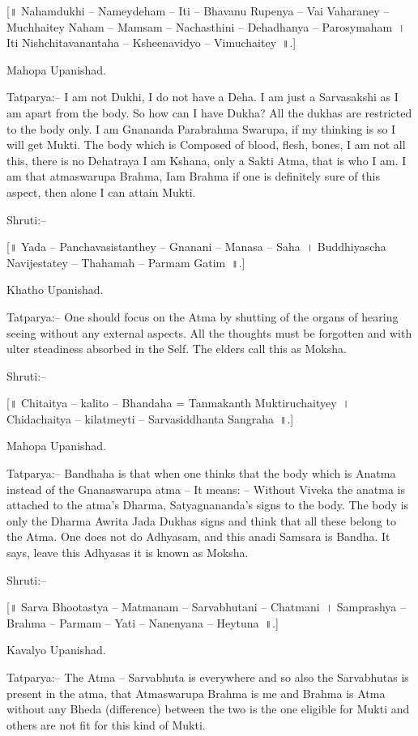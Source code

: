 [॥ Nahamdukhi – Nameydeham – Iti – Bhavanu Rupenya – Vai Vaharaney – Muchhaitey Naham – Mamsam – Nachasthini – Dehadhanya – Parosymaham~। Iti Nishchitavanantaha – Ksheenavidyo – Vimuchaitey~॥.]

Mahopa Upanishad.

Tatparya:– I am not Dukhi, I do not have a Deha. I am just a Sarvasakshi as I am apart from the body. So how can I have Dukha? All the dukhas are restricted to the body only. I am Gnananda Parabrahma Swarupa, if my thinking is so I will get Mukti. The body which is Composed of blood, flesh, bones, I am not all this, there is no Dehatraya I am Kshana, only a Sakti Atma, that is who I am. I am that atmaswarupa Brahma, Iam Brahma if one is definitely sure of this aspect, then alone I can attain Mukti.

Shruti:–

[॥ Yada – Panchavasistanthey – Gnanani – Manasa – Saha~। Buddhiyascha Navijestatey – Thahamah – Parmam Gatim~॥.]

Khatho Upanishad.

Tatparya:– One should focus on the Atma by shutting of the organs of hearing seeing without any external aspects. All the thoughts must be forgotten and with ulter steadiness absorbed in the Self. The elders call this as Moksha.

Shruti:–

[॥ Chitaitya – kalito – Bhandaha = Tanmakanth Muktiruchaityey~। Chidachaitya – kilatmeyti – Sarvasiddhanta Sangraha~॥.]

Mahopa Upanishad.

Tatparya:– Bandhaha is that when one thinks that the body which is Anatma instead of the Gnanaswarupa atma – It means: – Without Viveka the anatma is attached to the atma's Dharma, Satyagnananda's signs to the body. The body is only the Dharma Awrita Jada Dukhas signs and think that all these belong to the Atma. One does not do Adhyasam, and this anadi Samsara is Bandha. It says, leave this Adhyasas it is known as Moksha.

Shruti:–

[॥ Sarva Bhootastya – Matmanam – Sarvabhutani – Chatmani~। Samprashya – Brahma – Parmam – Yati – Nanenyana – Heytuna~॥.]

Kavalyo Upanishad.

Tatparya:– The Atma – Sarvabhuta is everywhere and so also the Sarvabhutas is present in the atma, that Atmaswarupa Brahma is me and Brahma is Atma without any Bheda (difference) between the two is the one eligible for Mukti and others are not fit for this kind of Mukti.

